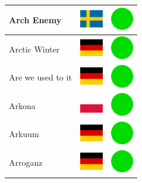 \documentclass[12pt, a4paper, twoside]{report}
\begin{document}
\begin{center}
\begin{longtable}{|p{5cm}|p{2cm}|p{2cm}|}
 Arch Enemy                                                 & \includegraphics[width=1cm]{../4x3/se} &   \includegraphics[width=1cm]{../likes/y} \\ \hline
 Arctic Winter                                              & \includegraphics[width=1cm]{../4x3/de} &   \includegraphics[width=1cm]{../likes/y} \\ \hline
 Are we used to it                                          & \includegraphics[width=1cm]{../4x3/de} &   \includegraphics[width=1cm]{../likes/y} \\ \hline
 Arkona                                                     & \includegraphics[width=1cm]{../4x3/pl} &   \includegraphics[width=1cm]{../likes/y} \\ \hline
 Arkuum                                                     & \includegraphics[width=1cm]{../4x3/de} &   \includegraphics[width=1cm]{../likes/y} \\ \hline
 Arroganz                                                   & \includegraphics[width=1cm]{../4x3/de} &   \includegraphics[width=1cm]{../likes/y} \\ \hline

\end{longtable}
\end{center}
\end{document}
